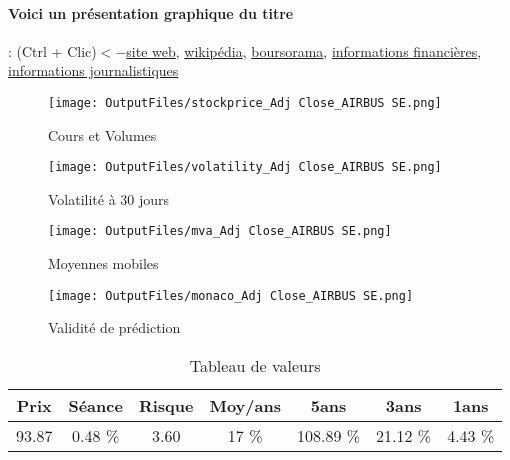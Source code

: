 \documentclass[11pt,a4paper]{report}%
\begin{document}
\paragraph{Voici un présentation graphique du titre} : (Ctrl + Clic)$<-$\href{https://www.airbus.com/investors.html}{site web}, \href{https://fr.wikipedia.org/wiki/Airbus_Commercial_Aircraft}{wikipédia}, \href{https://www.boursorama.com/cours/1rPAIR}{boursorama}, \href{https://www.qwant.com/?q=site:https:%2f%2fwww.easybourse.com%2faction-societe%2fAIRBUS-SE&t=web&client=ext-firefox-hp}{informations financières}, \href{https://bourse.lerevenu.com/cours-de-bourse/fiche-valeur-synthese/AIRBUS-SE/AIR-FR}{informations journalistiques}
\begin{figure}[!htb]
   \begin{minipage}{0.5\textwidth}
     \centering
     \texttt{[image: OutputFiles/stockprice\_Adj Close\_AIRBUS SE.png]}
     \caption{Cours et Volumes}\label{Fig:price_AIRBUS SE}
   \end{minipage}\hfill
   \begin{minipage}{0.5\textwidth}
     \centering
     \texttt{[image: OutputFiles/volatility\_Adj Close\_AIRBUS SE.png]}
     \caption{Volatilité à 30 jours}\label{Fig:volat_AIRBUS SE}
   \end{minipage}
\end{figure}
\begin{figure}[!htb]
   \begin{minipage}{0.5\textwidth}
     \centering
     \texttt{[image: OutputFiles/mva\_Adj Close\_AIRBUS SE.png]}
     \caption{Moyennes mobiles}\label{Fig:mva_AIRBUS SE}
   \end{minipage}\hfill
   \begin{minipage}{0.5\textwidth}
     \centering
     \texttt{[image: OutputFiles/monaco\_Adj Close\_AIRBUS SE.png]}
     \caption{Validité de prédiction}\label{Fig:prediction_AIRBUS SE}
   \end{minipage}
\end{figure}

\begin{table}[H]
  \centering
    \begin{tabular}{|c|c|c|c|c|c|c|}
    \hline
    Prix & Séance & Risque  & Moy/ans & 5ans & 3ans & 1ans \\
    \hline
    93.87 &    0.48 \%    & 3.60 & 17 \% & 108.89 \% & 21.12 \% & 4.43 \% \\
    \hline
    \end{tabular}%
        \label{tab:table_AIRBUS SE}%
      \caption{Tableau de valeurs}
\end{table}%
\end{document}
